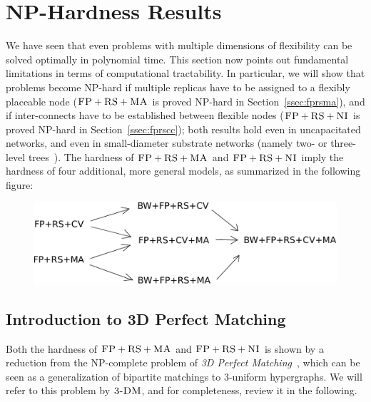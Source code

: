 \documentclass[9pt]{sigcomm-alternate}
\newcommand{\carlo}[1]{\textcolor{red}{carlo: #1}}
\newcommand{\CC}{\textsc{NI}}
\newcommand{\FP}{\textsc{FP}}
\newcommand{\RS}{\textsc{RS}}
\newcommand{\MA}{\textsc{MA}}
\newcommand{\TDM}{\textsc{3-DM}}
\begin{document}
\section{NP-Hardness Results}\label{sec:np}


We have seen that even problems with multiple dimensions of
flexibility can be solved optimally in polynomial time.
This section now points out fundamental
limitations in terms of computational tractability. In particular, we
will show that problems become NP-hard if multiple replicas have to be
assigned to a flexibly placeable node ($\FP+\RS+\MA$ is proved NP-hard in
Section~\ref{ssec:fprsma}), and if inter-connects have to be established
between flexible nodes ($\FP+\RS+\CC$ is proved NP-hard in Section~\ref{ssec:fprscc}); both
results hold even in uncapacitated networks, and even in small-diameter
substrate networks (namely two- or three-level trees~\cite{fattree}).
The hardness of $\FP+\RS+\MA$ and $\FP+\RS+\CC$ imply
the hardness of four additional, more general models, as
summarized in the following figure:

\begin{figure}[htbp]
\includegraphics[width = \columnwidth]{figs/np-hierarchy}
\end{figure}


\subsection{Introduction to 3D Perfect Matching}

Both the hardness of $\FP+\RS+\MA$ and $\FP+\RS+\CC$ is shown by a reduction
from the NP-complete problem of \emph{3D Perfect Matching}~\cite{3dmatch},
which
can be seen as a generalization of bipartite matchings to 3-uniform
hypergraphs. We will refer to this problem by $\TDM$, and for completeness,
review it in the following.
\end{document}
